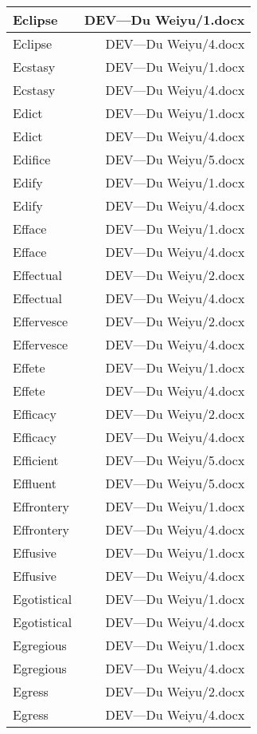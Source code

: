 \documentclass{article}
\begin{document}
\begin{center}
\begin{longtable}{|l|r|}
\hline
Eclipse  &  DEV---Du Weiyu/1.docx\\  
\hline
Eclipse  &  DEV---Du Weiyu/4.docx\\  
\hline
Ecstasy  &  DEV---Du Weiyu/1.docx\\  
\hline
Ecstasy  &  DEV---Du Weiyu/4.docx\\  
\hline
Edict  &  DEV---Du Weiyu/1.docx\\  
\hline
Edict  &  DEV---Du Weiyu/4.docx\\  
\hline
Edifice  &  DEV---Du Weiyu/5.docx\\  
\hline
Edify  &  DEV---Du Weiyu/1.docx\\  
\hline
Edify  &  DEV---Du Weiyu/4.docx\\  
\hline
Efface  &  DEV---Du Weiyu/1.docx\\  
\hline
Efface  &  DEV---Du Weiyu/4.docx\\  
\hline
Effectual  &  DEV---Du Weiyu/2.docx\\  
\hline
Effectual  &  DEV---Du Weiyu/4.docx\\  
\hline
Effervesce  &  DEV---Du Weiyu/2.docx\\  
\hline
Effervesce  &  DEV---Du Weiyu/4.docx\\  
\hline
Effete  &  DEV---Du Weiyu/1.docx\\  
\hline
Effete  &  DEV---Du Weiyu/4.docx\\  
\hline
Efficacy  &  DEV---Du Weiyu/2.docx\\  
\hline
Efficacy  &  DEV---Du Weiyu/4.docx\\  
\hline
Efficient  &  DEV---Du Weiyu/5.docx\\  
\hline
Effluent  &  DEV---Du Weiyu/5.docx\\  
\hline
Effrontery  &  DEV---Du Weiyu/1.docx\\  
\hline
Effrontery  &  DEV---Du Weiyu/4.docx\\  
\hline
Effusive  &  DEV---Du Weiyu/1.docx\\  
\hline
Effusive  &  DEV---Du Weiyu/4.docx\\  
\hline
Egotistical  &  DEV---Du Weiyu/1.docx\\  
\hline
Egotistical  &  DEV---Du Weiyu/4.docx\\  
\hline
Egregious  &  DEV---Du Weiyu/1.docx\\  
\hline
Egregious  &  DEV---Du Weiyu/4.docx\\  
\hline
Egress  &  DEV---Du Weiyu/2.docx\\  
\hline
Egress  &  DEV---Du Weiyu/4.docx\\  

\end{longtable}
\end{center}
\end{document}
